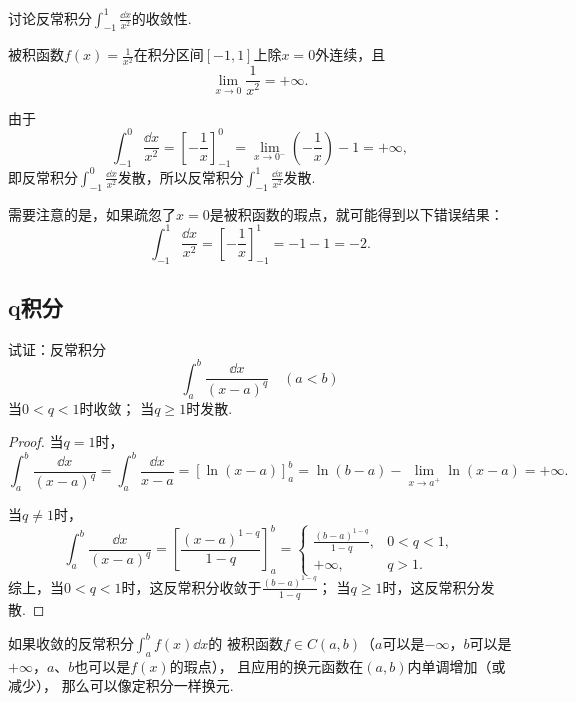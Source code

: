 \begin{example}
讨论反常积分\(\int_{-1}^1 \frac{\dd{x}}{x^2}\)的收敛性.
\begin{solution}
被积函数\(f(x) = \frac{1}{x^2}\)在积分区间\([-1,1]\)上除\(x=0\)外连续，且\[
\lim\limits_{x\to0} \frac{1}{x^2} = +\infty.
\]

由于\[
\int_{-1}^0 \frac{\dd{x}}{x^2}
= \left[-\frac{1}{x}\right]_{-1}^0
= \lim\limits_{x\to0^-} \left(-\frac{1}{x}\right) - 1
= +\infty,
\]即反常积分\(\int_{-1}^0 \frac{\dd{x}}{x^2}\)发散，所以反常积分\(\int_{-1}^1 \frac{\dd{x}}{x^2}\)发散.
\end{solution}

需要注意的是，如果疏忽了\(x=0\)是被积函数的瑕点，就可能得到以下错误结果：\[
\int_{-1}^1 \frac{\dd{x}}{x^2}
= \left[ -\frac{1}{x} \right]_{-1}^1
= -1 - 1 = -2.
\]
\end{example}

\subsection{q积分}
\begin{example}[q积分]\label{example:定积分.q积分}
试证：反常积分\[
\int_a^b \frac{\dd{x}}{(x-a)^q} \quad(a<b)
\]
当\(0 < q < 1\)时收敛；
当\(q \geq 1\)时发散.
\begin{proof}
当\(q=1\)时，\[
\int_a^b \frac{\dd{x}}{(x-a)^q}
= \int_a^b \frac{\dd{x}}{x-a}
= [\ln(x-a)]_a^b
= \ln(b-a) - \lim\limits_{x \to a^+} \ln(x-a) = +\infty.
\]

\def\arraystretch{1.5}
当\(q\neq1\)时，\[
\int_a^b \frac{\dd{x}}{(x-a)^q}
= \left[ \frac{(x-a)^{1-q}}{1-q} \right]_a^b
= \left\{ \begin{array}{cc}
\frac{(b-a)^{1-q}}{1-q}, & 0<q<1, \\
+\infty, & q>1.
\end{array} \right.
\]
综上，当\(0<q<1\)时，这反常积分收敛于\(\frac{(b-a)^{1-q}}{1-q}\)；
当\(q\geq1\)时，这反常积分发散.
\end{proof}
\end{example}

如果收敛的反常积分\(\int_a^b f(x) \dd{x}\)的%
被积函数\(f \in C(a,b)\)（\(a\)可以是\(-\infty\)，\(b\)可以是\(+\infty\)，\(a\)、\(b\)也可以是\(f(x)\)的瑕点），%
且应用的换元函数在\((a,b)\)内单调增加（或减少），%
那么可以像定积分一样换元.

